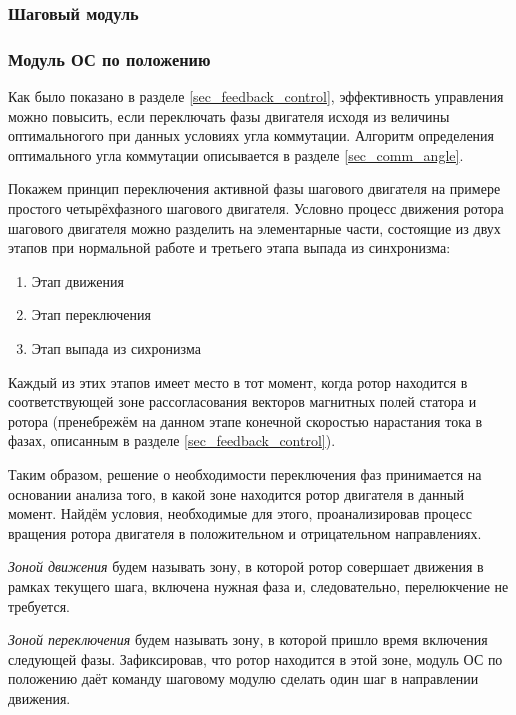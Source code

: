 \subsubsection{Шаговый модуль}



\subsubsection{Модуль ОС по положению}

Как было показано в разделе \ref{sec_feedback_control}, эффективность управления
можно повысить, если переключать фазы двигателя исходя из величины оптимальногого
при данных условиях угла коммутации. Алгоритм определения оптимального угла
коммутации описывается в разделе \ref{sec_comm_angle}.

Покажем принцип переключения активной фазы шагового двигателя на примере простого
четырёхфазного шагового двигателя. Условно процесс движения ротора шагового двигателя
можно разделить на элементарные части, состоящие из двух этапов при нормальной
работе и третьего этапа выпада из синхронизма:

\begin{enumerate}
    \item Этап движения
    \item Этап переключения
    \item Этап выпада из сихронизма
\end{enumerate}

Каждый из этих этапов имеет место в тот момент, когда ротор находится в
соответствующей зоне рассогласования векторов магнитных полей статора и ротора
(пренебрежём на данном этапе конечной скоростью нарастания тока в фазах, описанным
в разделе \ref{sec_feedback_control}).

Таким образом, решение о необходимости переключения фаз принимается на основании
анализа того, в какой зоне находится ротор двигателя в данный момент. Найдём условия,
необходимые для этого, проанализировав процесс вращения ротора двигателя в
положительном и отрицательном направлениях.

\textit{Зоной движения} будем называть зону, в которой ротор совершает движения в рамках
текущего шага, включена нужная фаза и, следовательно, перелюкчение не требуется.

\textit{Зоной переключения} будем называть зону, в которой пришло время включения
следующей фазы. Зафиксировав, что ротор находится в этой зоне, модуль ОС по положению
даёт команду шаговому модулю сделать один шаг в направлении движения.

